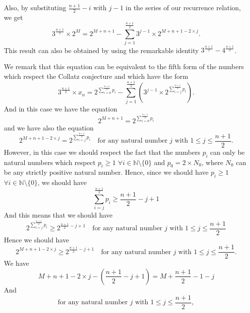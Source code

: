 \documentclass[11pt,a4paper]{article}
\newcommand{\N}{\mathbb{N}}
\newcommand{\Pf}[4]{2^{\sum_{#4=0}^{#1}#3_{#4}}-\sum_{j=1}^{#2}\left(3^{j-1}\times 2^{\sum_{#4=j}^{#1}#3_{#4}}\right)}
\theoremstyle{definition}
\begin{document}
Also, by substituting $\frac{n+1}{2}-i$ with $j-1$ in the series of our recurrence
relation, we get
\begin{equation}
3^{\frac{n+1}{2}}\times 2^{M}=2^{M+n+1}-\sum_{j=1}^{\frac{n+1}{2}}3^{j-1}\times 2^{M+n+1-2\times j}.
\end{equation}
This result can also be obtained by using the remarkable identity
$3^{\frac{n+1}{2}}-4^{\frac{n+1}{2}}$.

We remark that this equation can be equivalent to the fifth form of the numbers which
respect the Collatz conjecture and which have the form
\begin{equation}
3^{\frac{n+1}{2}}\times x_n=\Pf{\frac{n+1}{2}}{\frac{n+1}{2}}{p}{i}.
\end{equation}
And in this case we have the equation
\begin{equation}
2^{M+n+1}=2^{\sum_{i=0}^{\frac{n+1}{2}}p_i}
\end{equation}
and we have also the equation
\begin{equation}
2^{M+n+1-2\times j}=2^{\sum_{i=j}^{\frac{n+1}{2}}p_i}\quad\text{for any natural number }j\text{ with }1\le j\le\frac{n+1}{2}.
\end{equation}
However, in this case we should respect the fact that the numbers $p_i$ can only be
natural numbers which respect $p_i\ge 1$ $\forall i\in\N\setminus\{0\}$ and $p_0=2\times N_0$,
where $N_0$ can be any strictly positive natural number. Hence, since we should have
$p_i\ge 1$ $\forall i\in\N\setminus\{0\}$, we should have
\begin{equation}
\sum_{i=j}^{\frac{n+1}{2}}p_i\ge\frac{n+1}{2}-j+1
\end{equation}
And this means that we should have
\begin{equation}
2^{\sum_{i=j}^{\frac{n+1}{2}}p_i}\ge 2^{\frac{n+1}{2}-j+1}\quad\text{for any natural number }j\text{ with }1\le j\le\frac{n+1}{2}
\end{equation}
Hence we should have
\begin{equation}
2^{M+n+1-2\times j}\ge 2^{\frac{n+1}{2}-j+1}\quad\text{for any natural number }j\text{ with }1\le j\le\frac{n+1}{2}.
\end{equation}
We have
\begin{equation}
M+n+1-2\times j-\left(\frac{n+1}{2}-j+1\right)=M+\frac{n+1}{2}-1-j
\end{equation}
And
\begin{equation}
\text{for any natural number }j\text{ with }1\le j\le\frac{n+1}{2},
\end{equation}
\end{document}
